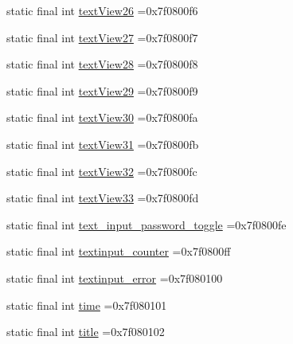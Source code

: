\begin{DoxyCompactItemize}
static final int \mbox{\hyperlink{classbr_1_1unb_1_1cic_1_1mp_1_1marketmaster_1_1R_1_1id_a1f46316d1377388b13235d2424120d0d}{text\+View26}} =0x7f0800f6
\item 
static final int \mbox{\hyperlink{classbr_1_1unb_1_1cic_1_1mp_1_1marketmaster_1_1R_1_1id_a1f2b2cefe60553cf643ff0560e7e21b1}{text\+View27}} =0x7f0800f7
\item 
static final int \mbox{\hyperlink{classbr_1_1unb_1_1cic_1_1mp_1_1marketmaster_1_1R_1_1id_ad395401d735290ac6783b87c0f1a0615}{text\+View28}} =0x7f0800f8
\item 
static final int \mbox{\hyperlink{classbr_1_1unb_1_1cic_1_1mp_1_1marketmaster_1_1R_1_1id_abfc2c813da838a075229bec8835ce14e}{text\+View29}} =0x7f0800f9
\item 
static final int \mbox{\hyperlink{classbr_1_1unb_1_1cic_1_1mp_1_1marketmaster_1_1R_1_1id_a72b34b9ab0279da5124b6d1a5bee2f36}{text\+View30}} =0x7f0800fa
\item 
static final int \mbox{\hyperlink{classbr_1_1unb_1_1cic_1_1mp_1_1marketmaster_1_1R_1_1id_a814ca493d0c6f8f86074b92b318d5b1e}{text\+View31}} =0x7f0800fb
\item 
static final int \mbox{\hyperlink{classbr_1_1unb_1_1cic_1_1mp_1_1marketmaster_1_1R_1_1id_a0766a9a57902686d63081f46ee61846d}{text\+View32}} =0x7f0800fc
\item 
static final int \mbox{\hyperlink{classbr_1_1unb_1_1cic_1_1mp_1_1marketmaster_1_1R_1_1id_a147ad52559660e3b485424c2f711dfcb}{text\+View33}} =0x7f0800fd
\item 
static final int \mbox{\hyperlink{classbr_1_1unb_1_1cic_1_1mp_1_1marketmaster_1_1R_1_1id_a491d78889a75bbf137752694573fe657}{text\+\_\+input\+\_\+password\+\_\+toggle}} =0x7f0800fe
\item 
static final int \mbox{\hyperlink{classbr_1_1unb_1_1cic_1_1mp_1_1marketmaster_1_1R_1_1id_a8adaebbd78a96b5c1e5a1174a8b76556}{textinput\+\_\+counter}} =0x7f0800ff
\item 
static final int \mbox{\hyperlink{classbr_1_1unb_1_1cic_1_1mp_1_1marketmaster_1_1R_1_1id_abcba69252d365d967f7a9b9813ea4b9f}{textinput\+\_\+error}} =0x7f080100
\item 
static final int \mbox{\hyperlink{classbr_1_1unb_1_1cic_1_1mp_1_1marketmaster_1_1R_1_1id_a73c1bd38e329f797555a5059d55a798b}{time}} =0x7f080101
\item 
static final int \mbox{\hyperlink{classbr_1_1unb_1_1cic_1_1mp_1_1marketmaster_1_1R_1_1id_a51bbde079c76769788f5e4f12d3cbef6}{title}} =0x7f080102
\item 

\end{DoxyCompactItemize}
